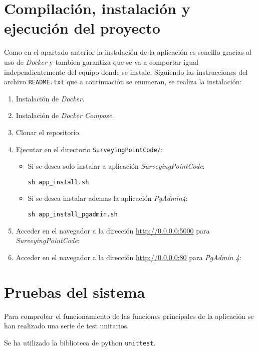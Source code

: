 \section{Compilación, instalación y ejecución del proyecto}\label{sec:instalacion}

Como en el apartado anterior la instalación de la aplicación es sencillo gracias al uso de \emph{Docker} y tambien garantiza que se va a comportar igual independientemente del equipo donde se instale. Siguiendo las instrucciones del archivo \texttt{README.txt} que a continuación se enumeran, se realiza la instalación:

\begin{enumerate}
\item Instalación de \emph{Docker.}
\item Instalación de \emph{Docker Compose.}
\item Clonar el repositorio.
\item Ejecutar en el directorio \texttt{SurveyingPointCode/}:

\begin{itemize}
\item Si se desea solo instalar a aplicación \emph{SurveyingPointCode}:

\texttt{sh app\_install.sh}

\item Si se desea instalar ademas la aplicación \emph{PgAdmin4}:

\texttt{sh app\_install\_pgadmin.sh}

\end{itemize}

\item Acceder en el navegador a la dirección \url{http://0.0.0.0:5000} para \emph{SurveyingPointCode}:

\item Acceder en el navegador a la dirección \url{http://0.0.0.0:80} para \emph{PgAdmin 4}:

\end{enumerate}


\section{Pruebas del sistema}

Para comprobar el funcionamiento de las funciones principales de la aplicación se han realizado una serie de test unitarios. 

Se ha utilizado la biblioteca de python \texttt{unittest}.


